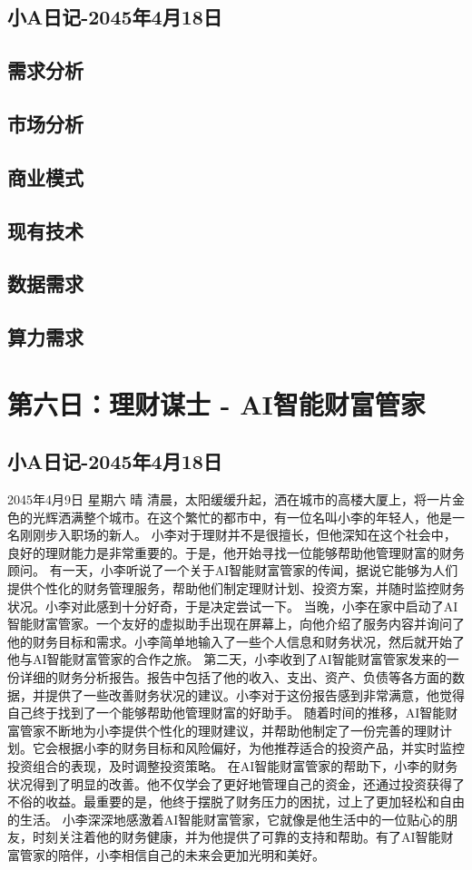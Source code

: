 \subsection{小A日记-2045年4月18日}
\subsection{需求分析}
\subsection{市场分析}
\subsection{商业模式}
\subsection{现有技术}
\subsection{数据需求}
\subsection{算力需求}

\section{第六日：理财谋士 - AI智能财富管家}
\subsection{小A日记-2045年4月18日}
2045年4月9日 星期六 晴
清晨，太阳缓缓升起，洒在城市的高楼大厦上，将一片金色的光辉洒满整个城市。在这个繁忙的都市中，有一位名叫小李的年轻人，他是一名刚刚步入职场的新人。
小李对于理财并不是很擅长，但他深知在这个社会中，良好的理财能力是非常重要的。于是，他开始寻找一位能够帮助他管理财富的财务顾问。
有一天，小李听说了一个关于AI智能财富管家的传闻，据说它能够为人们提供个性化的财务管理服务，帮助他们制定理财计划、投资方案，并随时监控财务状况。小李对此感到十分好奇，于是决定尝试一下。
当晚，小李在家中启动了AI智能财富管家。一个友好的虚拟助手出现在屏幕上，向他介绍了服务内容并询问了他的财务目标和需求。小李简单地输入了一些个人信息和财务状况，然后就开始了他与AI智能财富管家的合作之旅。
第二天，小李收到了AI智能财富管家发来的一份详细的财务分析报告。报告中包括了他的收入、支出、资产、负债等各方面的数据，并提供了一些改善财务状况的建议。小李对于这份报告感到非常满意，他觉得自己终于找到了一个能够帮助他管理财富的好助手。
随着时间的推移，AI智能财富管家不断地为小李提供个性化的理财建议，并帮助他制定了一份完善的理财计划。它会根据小李的财务目标和风险偏好，为他推荐适合的投资产品，并实时监控投资组合的表现，及时调整投资策略。
在AI智能财富管家的帮助下，小李的财务状况得到了明显的改善。他不仅学会了更好地管理自己的资金，还通过投资获得了不俗的收益。最重要的是，他终于摆脱了财务压力的困扰，过上了更加轻松和自由的生活。
小李深深地感激着AI智能财富管家，它就像是他生活中的一位贴心的朋友，时刻关注着他的财务健康，并为他提供了可靠的支持和帮助。有了AI智能财富管家的陪伴，小李相信自己的未来会更加光明和美好。
